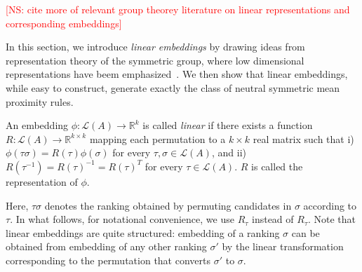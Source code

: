 \documentclass[10pt,letterpaper]{article}
\newcommand{\calL}{{\mathcal{L}}}
\newcommand{\rank}{{\calL(A)}}
\newenvironment{definition}[1][Definition]{\begin{trivlist}
\item[\hskip \labelsep {\bfseries #1}]}{\end{trivlist}}
\newcommand{\kibitz}[2]{\ifnum\Comments=1\textcolor{#1}{#2}\fi}
\newcommand{\cns}[1]{\kibitz{red} {[NS: #1]}}
\begin{document}
\cns{cite more of relevant group theorey literature on linear representations and corresponding embeddings}

In this section, we introduce \emph{linear embeddings} by drawing ideas from representation theory of the symmetric group, where low dimensional representations have beem emphasized~\cite{Burnside12,KT12}. We then show that linear embeddings, while easy to construct, generate exactly the class of neutral symmetric mean proximity rules. 


\begin{definition}[Linear Embeddings]
An embedding $\phi:\rank \rightarrow \mathbb{R}^k$ is called \emph{linear} if there exists a function $R : \rank \rightarrow \mathbb{R}^{k \times k}$ mapping each permutation to a $k \times k$ real matrix such that i) $\phi(\tau \sigma) = R(\tau) \phi(\sigma)$ for every $\tau,\sigma \in \rank$, and ii) $R(\tau^{-1}) = R(\tau)^{-1} = R(\tau)^T$ for every $\tau \in \rank$. $R$ is called the representation of $\phi$. 
\end{definition}
Here, $\tau \sigma$ denotes the ranking obtained by permuting candidates in $\sigma$ according to $\tau$. In what follows, for notational convenience, we use $R_{\tau}$ instead of $R_{\tau}$. Note that linear embeddings are quite structured: embedding of a ranking $\sigma$ can be obtained from embedding of any other ranking $\sigma'$ by the linear transformation corresponding to the permutation that converts $\sigma'$ to $\sigma$. 
\end{document}
